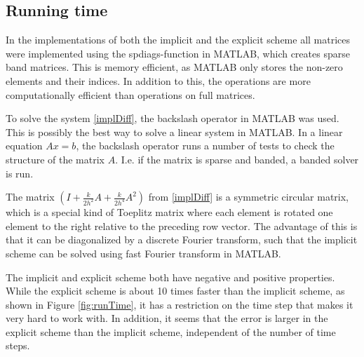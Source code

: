 \subsection{Running time}
In the implementations of both the implicit and the explicit scheme all matrices were implemented using the spdiags-function in MATLAB, which creates sparse band matrices. This is memory efficient, as MATLAB only stores the non-zero elements and their indices. In addition to this, the operations are more computationally efficient than operations on full matrices. \cite{sparse}

To solve the system \eqref{implDiff}, the backslash operator in MATLAB was used. This is possibly the best way to solve a linear system in MATLAB.  In a linear equation $Ax = b$, the backslash operator runs a number of tests to check the structure of the matrix $A$. I.e. if the matrix is sparse and banded, a banded solver is run.

The matrix $\left( I + \frac{k}{2h^2}A + \frac{k}{2h^4}A^2\right)$ from \eqref{implDiff} is a symmetric circular matrix, which is a special kind of Toeplitz matrix where each element is rotated one element to the right relative to the preceding row vector. The advantage of this is that it can be diagonalized by a discrete Fourier transform, such that the implicit scheme can be solved using fast Fourier transform in MATLAB.

The implicit and explicit scheme both have negative and positive properties. While the explicit scheme is about 10 times faster than the implicit scheme, as shown in Figure \ref{fig:runTime}, it has a restriction on the time step that makes it very hard to work with. In addition, it seems that the error is larger in the explicit scheme than the implicit scheme, independent of the number of time steps.

